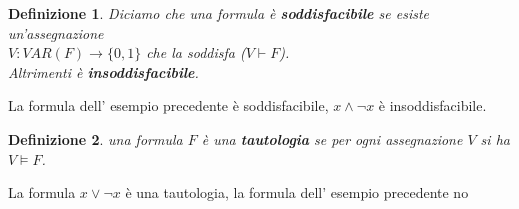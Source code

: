 \documentclass[a4paper,12pt]{article}
\theoremstyle{def}
\newtheorem*{definition}{Definizione}
\theoremstyle{prop}
\theoremstyle{esempio}
\theoremstyle{dimostrazione}
\theoremstyle{teo}
\theoremstyle{osservazione}
\begin{document}
\newpage
\begin{definition}
	Diciamo che una formula è \textbf{soddisfacibile} se esiste un'assegnazione\\
	\(V: VAR(F) \rightarrow \{0,1\}\) che la soddisfa (\(V \vdash F\)).\\
	Altrimenti è \textbf{insoddisfacibile}.
\end{definition}
La formula dell' esempio precedente è soddisfacibile, \(x \land \neg x\) è insoddisfacibile.\\

\begin{definition}
	una formula \(F\) è una \textbf{tautologia} se per ogni assegnazione \(V\) si ha \(V \vDash F\).\\
\end{definition}
La formula \(x \lor \neg x\) è una tautologia, la formula dell' esempio precedente no\\
\end{document}
